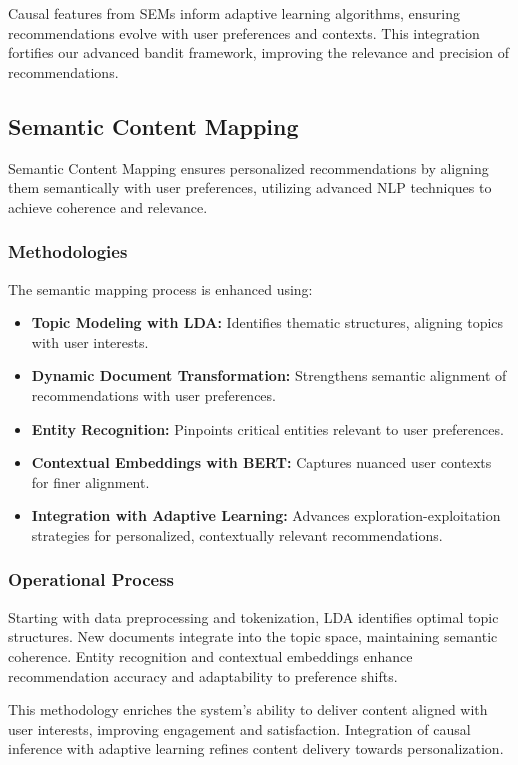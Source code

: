 \documentclass{article} %
\begin{document}
Causal features from SEMs inform adaptive learning algorithms, ensuring recommendations evolve with user preferences and contexts. This integration fortifies our advanced bandit framework, improving the relevance and precision of recommendations.

\subsection{Semantic Content Mapping}

Semantic Content Mapping ensures personalized recommendations by aligning them semantically with user preferences, utilizing advanced NLP techniques to achieve coherence and relevance.

\subsubsection{Methodologies}

The semantic mapping process is enhanced using:

\begin{itemize}
    \item \textbf{Topic Modeling with LDA:} Identifies thematic structures, aligning topics with user interests.
    \item \textbf{Dynamic Document Transformation:} Strengthens semantic alignment of recommendations with user preferences.
    \item \textbf{Entity Recognition:} Pinpoints critical entities relevant to user preferences.
    \item \textbf{Contextual Embeddings with BERT:} Captures nuanced user contexts for finer alignment.
    \item \textbf{Integration with Adaptive Learning:} Advances exploration-exploitation strategies for personalized, contextually relevant recommendations.
\end{itemize}

\subsubsection{Operational Process}

Starting with data preprocessing and tokenization, LDA identifies optimal topic structures. New documents integrate into the topic space, maintaining semantic coherence. Entity recognition and contextual embeddings enhance recommendation accuracy and adaptability to preference shifts.

This methodology enriches the system’s ability to deliver content aligned with user interests, improving engagement and satisfaction. Integration of causal inference with adaptive learning refines content delivery towards personalization.
\end{document}
